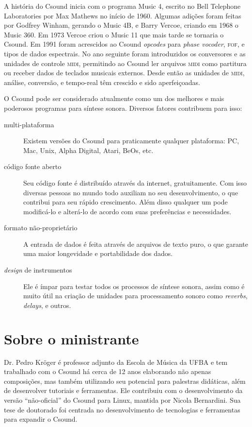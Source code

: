 \documentclass[12pt,brazil]{article}
\newcommand{\sigla}[1]{\textsc{#1}}
\newcommand{\eng}[1]{\textit{#1}}
\newcommand{\prog}[1]{\textsf{#1}}
\begin{document}
A história do Csound inicia com o programa \prog{Music 4}, escrito no
Bell Telephone Laboratories por Max Mathews no início de 1960. Algumas
adições foram feitas por Godfrey Winham, gerando o \prog{Music 4B}, e
Barry Vercoe, criando em 1968 o \prog{Music 360}. Em 1973 Vercoe criou
o \prog{Music 11} que mais tarde se tornaria o Csound. Em 1991 foram
acrescidos ao Csound \eng{opcodes} para \eng{phase vocoder},
\sigla{fof}, e tipos de dados espectrais. No ano seguinte foram
introduzidos os conversores e as unidades de controle \sigla{midi},
permitindo ao Csound ler arquivos \sigla{midi} como partitura ou
receber dados de teclados musicais externos. Desde então as unidades
de \sigla{midi}, análise, conversão, e tempo-real têm crescido e sido
aperfeiçoadas. \cite[1-1--1-2]{vercoe:manual}

O Csound pode ser considerado atualmente como um dos melhores e mais
poderosos programas para síntese sonora.  Diversos fatores contribuem
para isso:
\begin{description}
\item [multi-plataforma] Existem versões do {Csound} para praticamente
  qualquer plataforma: PC, Mac, Unix, Alpha Digital, Atari, BeOs, etc.
\item [código fonte aberto] Seu código fonte é distribuído através da
  internet, gratuitamente. Com isso diversas pessoas no mundo todo
  auxiliam no seu desenvolvimento, o que contribui para seu rápido
  crescimento. Além disso qualquer um pode modificá-lo e alterá-lo de
  acordo com suas preferências e necessidades.
\item [formato não-proprietário] A entrada de dados é feita através de
  arquivos de texto puro, o que garante uma maior longevidade e
  portabilidade dos dados.
\item [\eng{design} de instrumentos] Ele é ímpar para testar todos os
  processos de síntese sonora, assim como é muito útil na criação de
  unidades para processamento sonoro como \eng{reverbs}, \eng{delays},
  e outros.
\end{description}


\section{Sobre o ministrante} 

Dr. Pedro Kröger é professor adjunto da Escola de Música da UFBA e tem
trabalhado com o Csound há cerca de 12 anos elaborando não apenas
composições, mas também utilizando seu potencial para palestras
didáticas, além de desenvolver tutoriais e ferramentas. Ele contribuiu
com o desenvolvimento da versão ``não-oficial'' do Csound para Linux,
mantida por Nicola Bernardini. Sua tese de doutorado foi centrada no
desenvolvimento de tecnologias e ferramentas para expandir o Csound.
\end{document}

